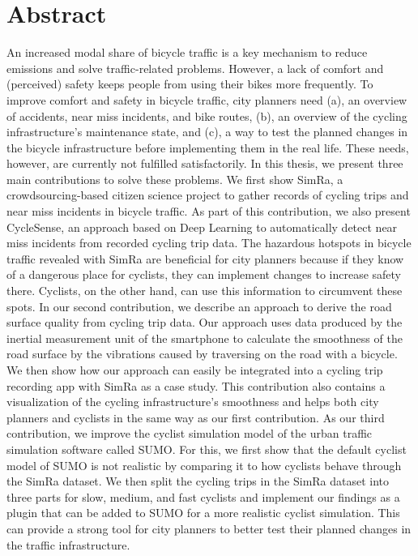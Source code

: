 
\cleardoublepage
{}
\section*{Abstract}
An increased modal share of bicycle traffic is a key mechanism to reduce emissions and solve traffic-related problems.
However, a lack of comfort and (perceived) safety keeps people from using their bikes more frequently.
To improve comfort and safety in bicycle traffic, city planners need (a), an overview of accidents, near miss incidents, and bike routes, (b), an overview of the cycling infrastructure's maintenance state, and (c), a way to test the planned changes in the bicycle infrastructure before implementing them in the real life.
These needs, however, are currently not fulfilled satisfactorily.
In this thesis, we present three main contributions to solve these problems.
We first show SimRa, a crowdsourcing-based citizen science project to gather records of cycling trips and near miss incidents in bicycle traffic.
As part of this contribution, we also present CycleSense, an approach based on Deep Learning to automatically detect near miss incidents from recorded cycling trip data.
The hazardous hotspots in bicycle traffic revealed with SimRa are beneficial for city planners because if they know of a dangerous place for cyclists, they can implement changes to increase safety there.
Cyclists, on the other hand, can use this information to circumvent these spots.
In our second contribution, we describe an approach to derive the road surface quality from cycling trip data.
Our approach uses data produced by the inertial measurement unit of the smartphone to calculate the smoothness of the road surface by the vibrations caused by traversing on the road with a bicycle. 
We then show how our approach can easily be integrated into a cycling trip recording app with SimRa as a case study.
This contribution also contains a visualization of the cycling infrastructure's smoothness and helps both city planners and cyclists in the same way as our first contribution.
As our third contribution, we improve the cyclist simulation model of the urban traffic simulation software called SUMO.
For this, we first show that the default cyclist model of SUMO is not realistic by comparing it to how cyclists behave through the SimRa dataset.
We then split the cycling trips in the SimRa dataset into three parts for slow, medium, and fast cyclists and implement our findings as a plugin that can be added to SUMO for a more realistic cyclist simulation.
This can provide a strong tool for city planners to better test their planned changes in the traffic infrastructure. 


